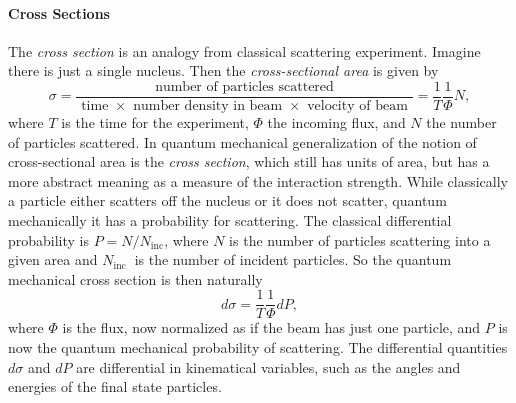 \documentclass[aps,prb,superscriptaddress,nofootinbib]{revtex4}
\begin{document}
\paragraph*{Cross Sections}
The \textit{cross section} is an analogy from classical scattering experiment.
Imagine there is just a single nucleus. 
Then the \textit{cross-sectional area} is given by
\begin{equation}
	\sigma=\frac{\text { number of particles scattered }}{\text { time } \times \text { number density in beam } \times \text { velocity of beam }}=\frac{1}{T} \frac{1}{\Phi} N,
\end{equation}
where $T$ is the time for the experiment, $\Phi$ the incoming flux, and $N$ the number of particles scattered.
In quantum mechanical generalization of the notion of cross-sectional area is the \textit{cross section}, which still has units of area, but has a more abstract meaning as a measure of the interaction strength. 
While classically a particle either scatters off the nucleus or it does not scatter, quantum mechanically it has a probability for scattering. 
The classical differential probability is $P=N/N_{\text{inc}}$, where $N$ is the number of particles scattering into a given area and $N_{\text {inc }}$ is the number of incident particles. 
So the quantum mechanical cross section is then naturally
\begin{equation}
	d \sigma=\frac{1}{T} \frac{1}{\Phi} d P,
\end{equation}
where $\Phi$ is the flux, now normalized as if the beam has just one particle, and $P$ is now the quantum mechanical probability of scattering. 
The differential quantities $d \sigma$ and $d P$ are differential in kinematical variables, such as the angles and energies of the final state particles.  
\end{document}
